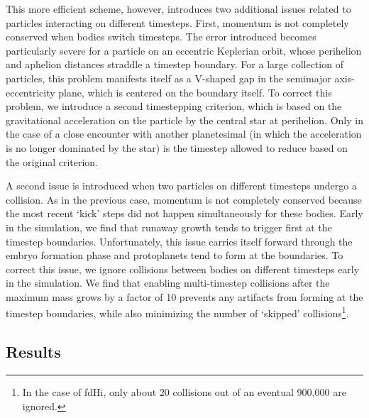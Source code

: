 \documentclass[twocolumn]{aastex63}
\begin{document}
This more efficient scheme, however, introduces two additional issues related to particles interacting on different timesteps. First, momentum is not completely conserved when bodies switch timesteps. The error introduced becomes particularly severe for a particle on an eccentric Keplerian orbit, whose perihelion and aphelion distances straddle a timestep boundary. For a large collection of particles, this problem manifests itself as a V-shaped gap in the semimajor axis-eccentricity plane, which is centered on the boundary itself. To correct this problem, we introduce a second timestepping criterion, which is based on the gravitational acceleration on the particle by the central star at perihelion. Only in the case of a close encounter with another planetesimal (in which the acceleration is no longer dominated by the star) is the timestep allowed to reduce based on the original criterion.

A second issue is introduced when two particles on different timesteps undergo a collision. As in the previous case, momentum is not completely conserved because the most recent `kick' steps did not happen simultaneously for these bodies. Early in the simulation, we find that runaway growth tends to trigger first at the timestep boundaries. Unfortunately, this issue carries itself forward through the embryo formation phase and protoplanets tend to form at the boundaries. To correct this issue, we ignore collisions between bodies on different timesteps early in the simulation. We find that enabling multi-timestep collisions after the maximum mass grows by a factor of 10 prevents any artifacts from forming at the timestep boundaries, while also minimizing the number of `skipped' collisions\footnote{In the case of fdHi, only about 20 collisions out of an eventual 900,000 are ignored.}. 

\subsection{Results}
\end{document}
